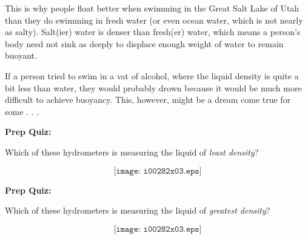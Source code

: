 This is why people float better when swimming in the Great Salt Lake of Utah than they do swimming in fresh water (or even ocean water, which is not nearly as salty).  Salt(ier) water is denser than fresh(er) water, which means a person's body need not sink as deeply to displace enough weight of water to remain buoyant.

If a person tried to swim in a vat of alcohol, where the liquid density is quite a bit less than water, they would probably drown because it would be much more difficult to achieve buoyancy.  This, however, might be a dream come true for some . . .







\vfil \eject

\noindent
{\bf Prep Quiz:}

Which of these hydrometers is measuring the liquid of {\it least density}?

$$\texttt{[image: i00282x03.eps]}$$

\vfil \eject

\noindent
{\bf Prep Quiz:}

Which of these hydrometers is measuring the liquid of {\it greatest density}?

$$\texttt{[image: i00282x03.eps]}$$





